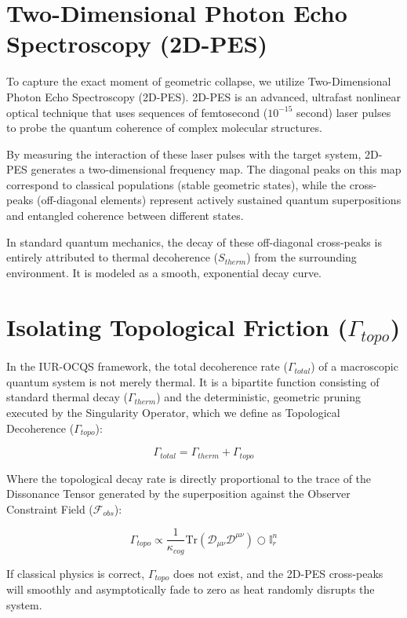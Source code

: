 \documentclass[12pt,openany]{book}
\begin{document}
\section{Two-Dimensional Photon Echo Spectroscopy (2D-PES)}
To capture the exact moment of geometric collapse, we utilize Two-Dimensional Photon Echo Spectroscopy (2D-PES). 2D-PES is an advanced, ultrafast nonlinear optical technique that uses sequences of femtosecond ($10^{-15}$ second) laser pulses to probe the quantum coherence of complex molecular structures. 

By measuring the interaction of these laser pulses with the target system, 2D-PES generates a two-dimensional frequency map. The diagonal peaks on this map correspond to classical populations (stable geometric states), while the cross-peaks (off-diagonal elements) represent actively sustained quantum superpositions and entangled coherence between different states.

In standard quantum mechanics, the decay of these off-diagonal cross-peaks is entirely attributed to thermal decoherence ($S_{therm}$) from the surrounding environment. It is modeled as a smooth, exponential decay curve.

\section{Isolating Topological Friction ($\Gamma_{topo}$)}
In the IUR-OCQS framework, the total decoherence rate ($\Gamma_{total}$) of a macroscopic quantum system is not merely thermal. It is a bipartite function consisting of standard thermal decay ($\Gamma_{therm}$) and the deterministic, geometric pruning executed by the Singularity Operator, which we define as Topological Decoherence ($\Gamma_{topo}$):

\begin{equation}
\Gamma_{total} = \Gamma_{therm} + \Gamma_{topo}
\end{equation}

Where the topological decay rate is directly proportional to the trace of the Dissonance Tensor generated by the superposition against the Observer Constraint Field ($\mathcal{F}_{obs}$):

\begin{equation}
\Gamma_{topo} \propto \frac{1}{\kappa_{cog}} \text{Tr}(\mathcal{D}_{\mu\nu} \mathcal{D}^{\mu\nu}) \bigcirc \mathbb{I}_r^n
\end{equation}

If classical physics is correct, $\Gamma_{topo}$ does not exist, and the 2D-PES cross-peaks will smoothly and asymptotically fade to zero as heat randomly disrupts the system. 
\end{document}
